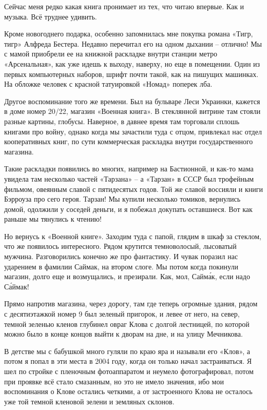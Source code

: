 Сейчас меня редко какая книга пронимает из тех, что читаю впервые. Как и музыка. Всё труднее удивить.

Кроме новогоднего подарка, особенно запомнилась мне покупка романа «Тигр, тигр» Алфреда Бестера. Не\-давно перечитал его на одном дыхании – отлично! Мы с мамой приобрели ее на книжной раскладке внутри станции метро «Арсенальная», как уже идешь к выходу, наверху, но еще в помещении. Один из первых компьютерных наборов, шрифт почти такой, как на пишущих машинках. На обложке человек с красной татуировкой «Номад» поперек лба.

Другое воспоминание того же времени. Был на бульваре Леси Украинки, кажется в доме номер 20/22, магазин «Военная книга». В стеклянной витрине там стояли разные картины, глобусы. Наверное, в давнее время там торговали сплошь книгами про войну, однако когда мы зачастили туда с отцом, привлекал нас отдел кооперативных книг, по сути коммерческая раскладка внутри государственного магазина. 

Такие раскладки появились во многих, например на Бастионной, и как-то мама увидела там несколько частей «Тарзана» – а «Тарзан» в СССР был трофейным фильмом, овеянным славой с пятидесятых годов. Той же славой воссияли и книги Бэрроуза про сего героя. Тарзан! Мы купили несколько томиков, вернулись домой, одолжили у соседей деньги, и я побежал докупать оставшиеся. Вот как раньше мы тянулись к чтению!

Но вернусь к «Военной книге». Заходим туда с папой, глядим в шкаф за стеклом, что же появилось интересного. Рядом крутится темноволосый, лысоватый мужчина. Разговорились конечно же про фантастику. И чувак поразил нас ударением в фамилии Саймак, на втором слоге. Мы потом когда покинули магазин, долго еще и возмущались, и презирали. Как, мол, Сайм\'ак, если надо С\'аймак!
 
Прямо напротив магазина, через дорогу, там где теперь огромные здания, рядом с десятиэтажкой номер 9 был зеленый пригорок, и левее от него, на север, темной зеленью кленов глубинел овраг Клова с долгой лестницей, по которой можно было в конце концов выйти к дворам на дне, и на улицу Мечникова.

В детстве мы с бабушкой много гуляли по краю яра и называли его «Клов», а потом я попал в эти места в 2004 году, когда он только начал застраиваться. Я шел по стройке с пленочным фотоаппаратом и неумело фотографировал, потом при проявке всё стало смазанным, но это не имело значения, ибо мои воспоминания о Клове остались четкими, а от застроенного Клова не осталось уже той темной кленовой зелени и земляных склонов.

